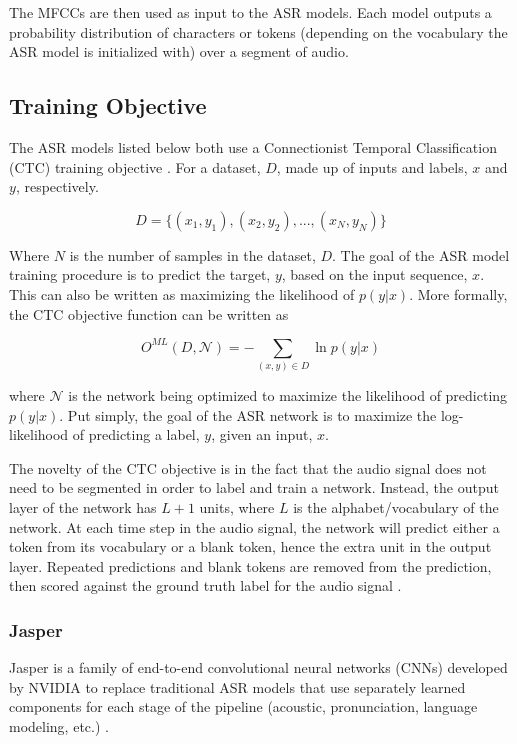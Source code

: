 \documentclass[12pt]{article}
\begin{document}
\noindent
The MFCCs are then used as input to the ASR models. Each model outputs a probability distribution of characters or tokens (depending on the vocabulary
the ASR model is initialized with) over a segment of audio.

\subsection{Training Objective}\label{sec:asr_training_objective}
The ASR models listed below both use a Connectionist Temporal Classification (CTC) training objective \cite{graves_connectionist_2006}. For a
dataset, $D$, made up of inputs and labels, $x$ and $y$, respectively.

\begin{equation}\label{eq:ctc_dataset}
    D = \{(x_1, y_1), (x_2, y_2), ..., (x_N, y_N)\}
\end{equation}

\noindent
Where $N$ is the number of samples in the dataset, $D$. The goal of the ASR model training procedure is to predict the target, $y$, based on the input
sequence, $x$. This can also be written as maximizing the likelihood of $p(y|x)$. More formally, the CTC objective function can be written as

\begin{equation}\label{eq:ctc_objective}
    O^{ML}(D, \mathcal{N}) = - \sum_{(x,y) \in D} \ln p(y|x)
\end{equation}

\noindent
where $\mathcal{N}$ is the network being optimized to maximize the likelihood of predicting $p(y|x)$. Put simply, the goal of the ASR network is to
maximize the log-likelihood of predicting a label, $y$, given an input, $x$.

The novelty of the CTC objective is in the fact that the audio signal does not need to be segmented in order to label and train a network. Instead,
the output layer of the network has $L + 1$ units, where $L$ is the alphabet/vocabulary of the network. At each time step in the audio signal, the
network will predict either a token from its vocabulary or a blank token, hence the extra unit in the output layer. Repeated predictions and blank
tokens are removed from the prediction, then scored against the ground truth label for the audio signal \cite{graves_connectionist_2006}.

\subsubsection{Jasper}\label{sec:jasper}
Jasper is a family of end-to-end convolutional neural networks (CNNs) developed by NVIDIA to replace traditional ASR models that use separately
learned components for each stage of the pipeline (acoustic, pronunciation, language modeling, etc.) \cite{li_jasper_2019}.
\end{document}

